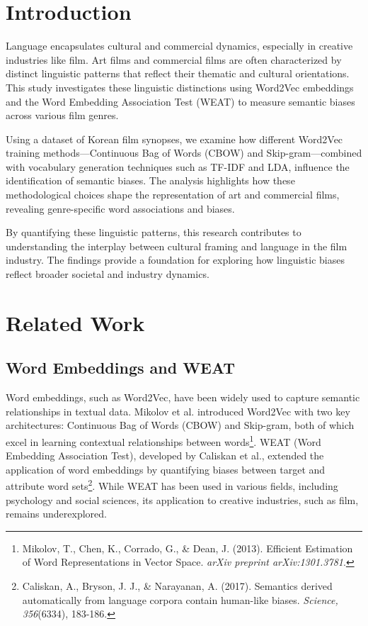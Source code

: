 \documentclass[conference]{IEEEtran}
\begin{document}
\section{Introduction}
Language encapsulates cultural and commercial dynamics, especially in creative industries like film. Art films and commercial films are often characterized by distinct linguistic patterns that reflect their thematic and cultural orientations. This study investigates these linguistic distinctions using Word2Vec embeddings and the Word Embedding Association Test (WEAT) to measure semantic biases across various film genres.

Using a dataset of Korean film synopses, we examine how different Word2Vec training methods—Continuous Bag of Words (CBOW) and Skip-gram—combined with vocabulary generation techniques such as TF-IDF and LDA, influence the identification of semantic biases. The analysis highlights how these methodological choices shape the representation of art and commercial films, revealing genre-specific word associations and biases.

By quantifying these linguistic patterns, this research contributes to understanding the interplay between cultural framing and language in the film industry. The findings provide a foundation for exploring how linguistic biases reflect broader societal and industry dynamics.

\section{Related Work}

\subsection{Word Embeddings and WEAT}
Word embeddings, such as Word2Vec, have been widely used to capture semantic relationships in textual data. Mikolov et al. introduced Word2Vec with two key architectures: Continuous Bag of Words (CBOW) and Skip-gram, both of which excel in learning contextual relationships between words\footnote{Mikolov, T., Chen, K., Corrado, G., \& Dean, J. (2013). Efficient Estimation of Word Representations in Vector Space. \textit{arXiv preprint arXiv:1301.3781}.}. WEAT (Word Embedding Association Test), developed by Caliskan et al., extended the application of word embeddings by quantifying biases between target and attribute word sets\footnote{Caliskan, A., Bryson, J. J., \& Narayanan, A. (2017). Semantics derived automatically from language corpora contain human-like biases. \textit{Science, 356}(6334), 183-186.}. While WEAT has been used in various fields, including psychology and social sciences, its application to creative industries, such as film, remains underexplored.
\end{document}
